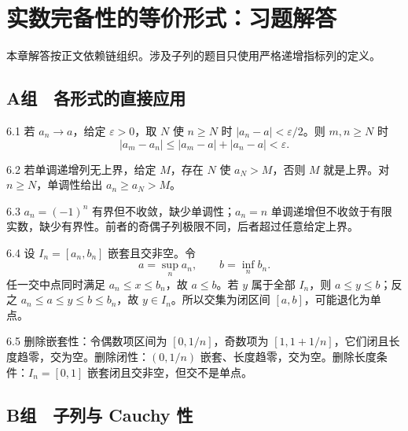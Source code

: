 \chapter{实数完备性的等价形式：习题解答}

\begin{chapterguide}
本章解答按正文依赖链组织。涉及子列的题目只使用严格递增指标列的定义。
\end{chapterguide}

\section*{A组　各形式的直接应用}

\begin{solution}{6.1}
若 \(a_n\to a\)，给定 \(\varepsilon>0\)，取 \(N\) 使 \(n\ge N\) 时 \(|a_n-a|<\varepsilon/2\)。则 \(m,n\ge N\) 时
\[
 |a_m-a_n|\le|a_m-a|+|a_n-a|<\varepsilon.
\]
\end{solution}

\begin{solution}{6.2}
若单调递增列无上界，给定 \(M\)，存在 \(N\) 使 \(a_N>M\)，否则 \(M\) 就是上界。对 \(n\ge N\)，单调性给出 \(a_n\ge a_N>M\)。
\end{solution}

\begin{solution}{6.3}
\(a_n=(-1)^n\) 有界但不收敛，缺少单调性；\(a_n=n\) 单调递增但不收敛于有限实数，缺少有界性。前者的奇偶子列极限不同，后者超过任意给定上界。
\end{solution}

\begin{solution}{6.4}
设 \(I_n=[a_n,b_n]\) 嵌套且交非空。令
\[
 a=\sup_n a_n,\qquad b=\inf_n b_n.
\]
任一交中点同时满足 \(a_n\le x\le b_n\)，故 \(a\le b\)。若 \(y\) 属于全部 \(I_n\)，则 \(a\le y\le b\)；反之 \(a_n\le a\le y\le b\le b_n\)，故 \(y\in I_n\)。所以交集为闭区间 \([a,b]\)，可能退化为单点。
\end{solution}

\begin{solution}{6.5}
删除嵌套性：令偶数项区间为 \([0,1/n]\)，奇数项为 \([1,1+1/n]\)，它们闭且长度趋零，交为空。删除闭性：\((0,1/n)\) 嵌套、长度趋零，交为空。删除长度条件：\(I_n=[0,1]\) 嵌套闭且交非空，但交不是单点。
\end{solution}

\section*{B组　子列与 Cauchy 性}

